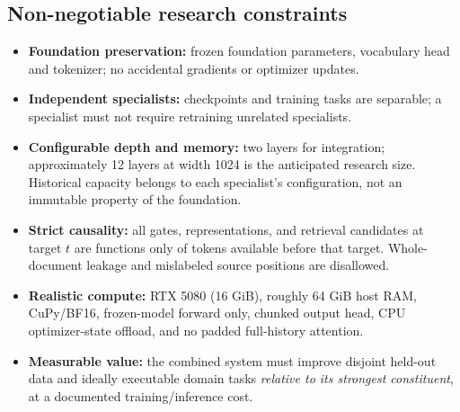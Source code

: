 \documentclass[11pt,letterpaper]{article}
\begin{document}
\subsection{Non-negotiable research constraints}
\begin{itemize}
\item \textbf{Foundation preservation:} frozen foundation parameters, vocabulary head and tokenizer; no accidental gradients or optimizer updates.
\item \textbf{Independent specialists:} checkpoints and training tasks are separable; a specialist must not require retraining unrelated specialists.
\item \textbf{Configurable depth and memory:} two layers for integration; approximately 12 layers at width 1024 is the anticipated research size. Historical capacity belongs to each specialist's configuration, not an immutable property of the foundation.
\item \textbf{Strict causality:} all gates, representations, and retrieval candidates at target $t$ are functions only of tokens available before that target. Whole-document leakage and mislabeled source positions are disallowed.
\item \textbf{Realistic compute:} RTX 5080 (16 GiB), roughly 64 GiB host RAM, CuPy/BF16, frozen-model forward only, chunked output head, CPU optimizer-state offload, and no padded full-history attention.
\item \textbf{Measurable value:} the combined system must improve disjoint held-out data and ideally executable domain tasks \emph{relative to its strongest constituent}, at a documented training/inference cost.
\end{itemize}
\end{document}
